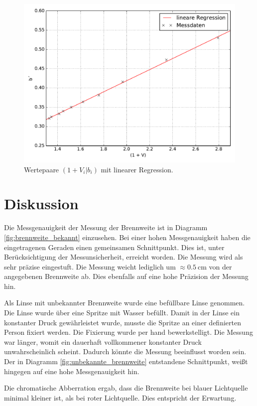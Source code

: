 \begin{figure}
  \centering
  \includegraphics[width=\textwidth]{Messung_abbe_b.pdf}
  \caption{Wertepaare $(1 + V_i|b_i)$ mit linearer Regression.}
  \label{fig:abbe_b}
\end{figure}

\section{Diskussion}

Die Messgenauigkeit der Messung der Brennweite ist in Diagramm
\ref{fig:brennweite_bekannt} einzusehen. Bei einer hohen Messgenauigkeit haben
die eingetragenen Geraden einen gemeinsamen Schnittpunkt. Dies ist, unter
Berücksichtigung der Messunsicherheit, erreicht worden. Die Messung wird als
sehr präzise eingestuft. Die Messung weicht lediglich um
$\approx\SI{0,5}{\centi\meter}$ von der angegebenen Brennweite ab. Dies ebenfalls
auf eine hohe Präzision der Messung hin.

Als Linse mit unbekannter Brennweite wurde eine befüllbare Linse genommen. Die
Linse wurde über eine Spritze mit Wasser befüllt. Damit in der Linse ein konstanter
Druck gewährleistet wurde, musste die Spritze an einer definierten Person fixiert
werden. Die Fixierung wurde per hand bewerkstelligt. Die Messung war länger, womit
ein dauerhaft vollkommener konstanter Druck unwahrscheinlich scheint. Dadurch könnte
die Messung beeinflusst worden sein. Der in Diagramm
\ref{fig:unbekannte_brennweite} entstandene Schnittpunkt, weißt hingegen auf eine
hohe Messgenauigkeit hin.



Die chromatische Abberration ergab, dass die Brennweite bei blauer Lichtquelle
minimal kleiner ist, als bei roter Lichtquelle. Dies entspricht der Erwartung.


